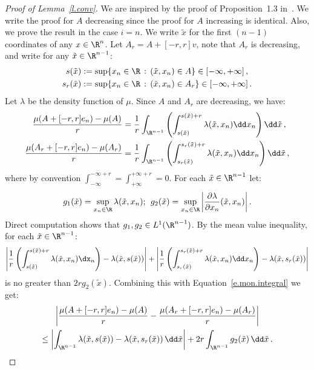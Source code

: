 \begin{proof}[Proof of Lemma~\ref{l.conv}] We are inspired by the proof of Proposition~1.3 in~\cite{keller2012geometric}. We write the proof for $A$ decreasing since the proof for $A$ increasing is identical. Also, we prove the result in the case $i = n$. We write $\tilde{x}$ for the first $(n-1)$ coordinates of any $x\in\R^n$. Let $A_r = A + [-r,r]v$, note that $A_r$ is decreasing, and write for any $\tilde{x}\in\R^{n-1}$:
\begin{align*}
s(\tilde{x}) &:= \sup \lbrace x_n \in \R \, : \, (\tilde{x}, x_n) \in A \rbrace \in [-\infty,+\infty] \,,\\
s_r(\tilde{x}) &:= \sup \lbrace x_n \in \R \, : \, (\tilde{x}, x_n) \in A_r \rbrace \in [-\infty,+\infty] \,.
\end{align*}
Let $\lambda$ be the density function of $\mu$. Since $A$ and $A_r$ are decreasing, we have:
\begin{align}\label{e.mon.integral}
\frac{\mu (A + [-r,r] e_n) - \mu (A)}{r} &= \frac{1}{r} \int_{\R^{n-1}} \left(\int_{s(\tilde{x})}^{s(\tilde{x})+r} \lambda(\tilde{x},x_n) \dd x_n\right)\dd\tilde{x} \,, \nonumber\\
\frac{\mu (A_r + [-r,r] e_n) - \mu (A_r)}{r} &= \frac{1}{r} \int_{\R^{n-1}} \left(\int_{s_r(\tilde{x})}^{s_r(\tilde{x})+r} \lambda(\tilde{x},x_n) \dd x_n\right)\dd\tilde{x} \,,
\end{align}
where by convention $\int_{-\infty}^{-\infty+r} = \int_{+\infty}^{+\infty+r} = 0$. For each $\tilde{x}\in\R^{n-1}$ let:
\[
g_1(\tilde{x})=\sup_{x_n\in\R}\lambda(\tilde{x},x_n);\: \: g_2(\tilde{x})=\sup_{x_n\in\R}\left|\frac{\partial\lambda}{\partial x_n}(\tilde{x},x_n)\right|.
\]
Direct computation shows that $g_1,g_2\in L^1(\R^{n-1})$. By the mean value inequality, for each $\tilde{x}\in\R^{n-1}$:
\[
\left|\frac{1}{r}\left(\int_{s(\tilde{x})}^{s(\tilde{x})+r} \lambda(\tilde{x},x_n) \dx_n\right)-\lambda(\tilde{x},s(\tilde{x}))\right|+\left|\frac{1}{r}\left(\int_{s_r(\tilde{x})}^{s_r(\tilde{x})+r} \lambda(\tilde{x},x_n) \dd x_n\right)-\lambda(\tilde{x},s_r(\tilde{x}))\right|
\]
is no greater than $2rg_2(\tilde{x})$. Combining this with Equation~\eqref{e.mon.integral} we get:
\begin{multline*}
\left|\frac{\mu (A + [-r,r] e_n) - \mu (A)}{r}- \frac{\mu (A_r + [-r,r] e_n) - \mu (A_r)}{r} \right|\\
\leq \left|\int_{\R^{n-1}}\lambda(\tilde{x},s(\tilde{x})) -\lambda(\tilde{x},s_r(\tilde{x})) \, \dd\tilde{x}\right|+2r\int_{\R^{n-1}}g_2(\tilde{x}) \, \dd\tilde{x}\,.

\end{multline*}
\end{proof}
